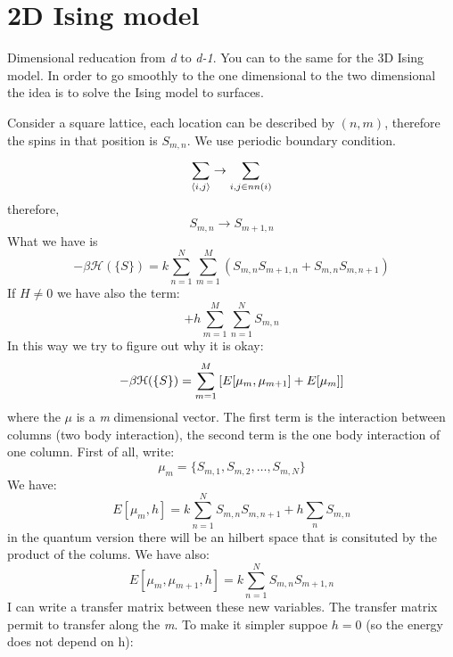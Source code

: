 \documentclass[../main/main.tex]{subfiles}
\begin{document}
\section{2D Ising model}
Dimensional reducation from \emph{d} to \emph{d-1}. You can to the same for the 3D Ising model. In order to go smoothly to the one dimensional to the two dimensional the idea is to solve the Ising model to surfaces.

Consider a square lattice, each location can be described by \( (n,m) \), therefore the spins in that position is \( S_{m,n} \). We use periodic boundary condition.
\begin{equation}
  \sum_{\expval{i,j} }^{}  \rightarrow \sum_{i,j \in nn(i)}^{}
\end{equation}
therefore,
\begin{equation}
  S_{m,n} \rightarrow S_{m+1,n}
\end{equation}
What we have is
\begin{equation}
  -\beta \mathcal{H} ( \{ S \}  ) = k \sum_{n=1}^{N} \sum_{m=1}^{M} (S_{m,n} S_{m+1,n}+S_{m,n}S_{m,n+1})
\end{equation}
If \( H \neq 0 \) we have also the term:
\begin{equation}
  + h\sum_{m=1}^{M} \sum_{n=1}^{N} S_{m,n}
\end{equation}
In this way we try to figure out why it is okay:
\begin{equation}
  -\beta \mathcal{H} ( \{ S \}  ) = \sum_{m=1}^{M} \qty[E[\mu _m, \mu _{m+1}] + E[\mu _m]]
\end{equation}
where the \( \mu  \)  is a \emph{m} dimensional vector. The first term is the interaction between columns (two body interaction), the second term is the one body interaction of one column. First of all, write:
\begin{equation}
  \mu _m = \{ S_{m,1}, S_{m,2}, \dots, S_{m,N} \}
  \label{eq:9_1}
\end{equation}
We have:
\begin{equation}
  E [ \mu _m,h] = k \sum_{n=1}^{N} S_{m,n} S_{m,n+1} + h \sum_{n}^{} S_{m,n}
\end{equation}
in the quantum version there will be an hilbert space that is consituted by the product of the colums.
We have also:
\begin{equation}
  E [\mu _m, \mu _{m+1},h] = k \sum_{n=1}^{N} S_{m,n} S_{m+1,n}
\end{equation}
I can write a transfer matrix between these new variables. The transfer matrix permit to transfer along the \emph{m}. To make it simpler suppoe \( h=0 \) (so the energy does not depend on h):
\end{document}
